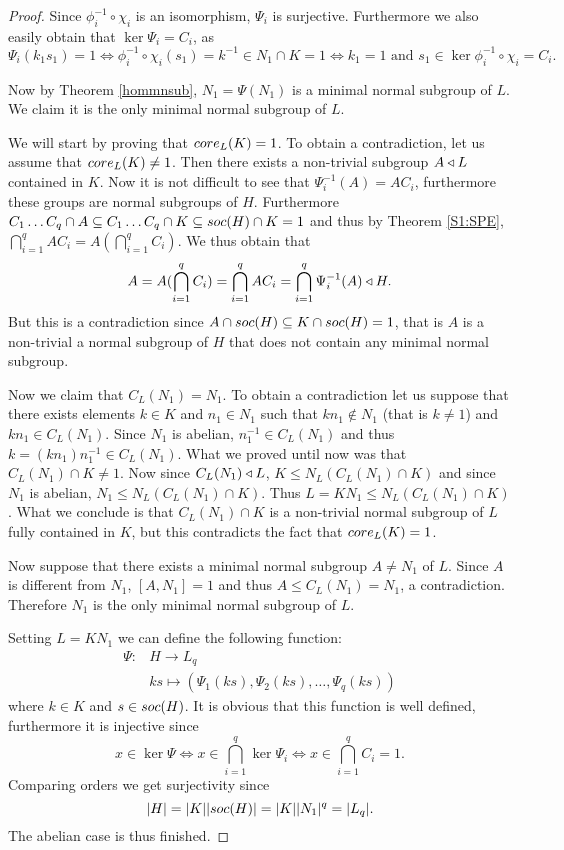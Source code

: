 \begin{proof}
    Since $\phi_i^{-1} \circ \chi_i$ is an isomorphism, $\Psi_i$ is surjective. Furthermore we also easily obtain that $\ker \Psi_i = C_i$, as 
    $$
    \Psi_i(k_1s_1) = 1 \iff \phi_i^{-1} \circ \chi_i(s_1) = k^{-1}  \in N_1 \cap K = 1 \iff k_1 = 1 \text{ and } s_1 \in \ker{\phi_i^{-1} \circ \chi_i} = C_i.
    $$ 
    
    Now by Theorem \ref{hommnsub}, $N_1 = \Psi(N_1)$ is a minimal normal subgroup of $L$. We claim it is the only minimal normal subgroup of $L$.
    
    We will start by proving that $\core[L]{K} = 1$.
    To obtain a contradiction, let us assume that $\core[L]{K} \ne 1$. 
    Then there exists a non-trivial subgroup $A \nsub L$ contained in $K$.
    Now it is not difficult to see that $\Psi_i^{-1}(A) = AC_i$, furthermore these groups are normal subgroups of $H$. Furthermore $C_1\ldots C_q \cap A \subseteq C_1\ldots C_q \cap K \subseteq \soc{H} \cap K = 1$ and thus by Theorem
    \ref{S1:SPE}, $\bigcap_{i=1}^q AC_i = A(\bigcap_{i=1}^q C_i)$. We thus obtain that 
    $$
    A = A(\bigcap_{i=1}^q C_i) = \bigcap_{i=1}^q AC_i = \bigcap_{i=1}^{q}\Psi_i^{-1}(A) \nsub H.
    $$
    But this is a contradiction since $A \cap \soc{H} \subseteq K \cap \soc{H} = 1$, that is $A$ is a non-trivial a normal subgroup of $H$ that does not contain any minimal normal subgroup.
    
    Now we claim that $C_L(N_1) = N_1$. To obtain a contradiction let us suppose that there exists elements $k \in K$ and $n_1 \in N_1$ such that $kn_1 \notin N_1$ (that is $k \ne 1$) and $kn_1 \in C_L(N_1)$. Since $N_1$ is abelian, $n_1^{-1} \in C_L(N_1)$ and thus $k = (kn_1)n_1^{-1} \in C_L(N_1)$. What we proved until now was that $C_L(N_1) \cap K \ne 1$. Now since $C_L(N_1) \nsub L$, $K \le N_L(C_L(N_1) \cap K)$ and since $N_1$ is abelian, $N_1 \le N_L(C_L(N_1) \cap K)$. Thus $L = KN_1 \le N_L(C_L(N_1) \cap K)$. What we conclude is that $C_L(N_1) \cap K$ is a non-trivial normal subgroup of $L$ fully contained in $K$, but this contradicts the fact that $\core[L]{K} = 1$.

    Now suppose that there exists a minimal normal subgroup $A \ne N_1$ of $L$. Since $A$ is different from $N_1$,
    $[A,N_1] = 1$ and thus $A \le C_L(N_1) = N_1$, a contradiction. Therefore $N_1$ is the only minimal normal subgroup of $L$.   

    Setting $L=KN_1$ we can define the following function:
    \begin{align*}
        \Psi \colon &H \longrightarrow L_q \\
                 &ks \mapsto  (\Psi_1(ks),\Psi_2(ks),\ldots ,\Psi_q(ks))
    \end{align*}
    where $k \in K$ and $s \in \soc H$. 
    It is obvious that this function is well defined, furthermore it is injective since 
    $$
    x \in \ker \Psi \iff x \in \bigcap_{i=1}^{q} \ker \Psi_i
    \iff x \in \bigcap_{i=1}^{q} C_i = 1.
    $$
    Comparing orders we get surjectivity since 
    $$
    \card{H} = \card{K}\card{\soc{H}} = \card{K}\card{N_1}^q = \card{L_q}.
    $$ The abelian case is thus finished.


\end{proof}
